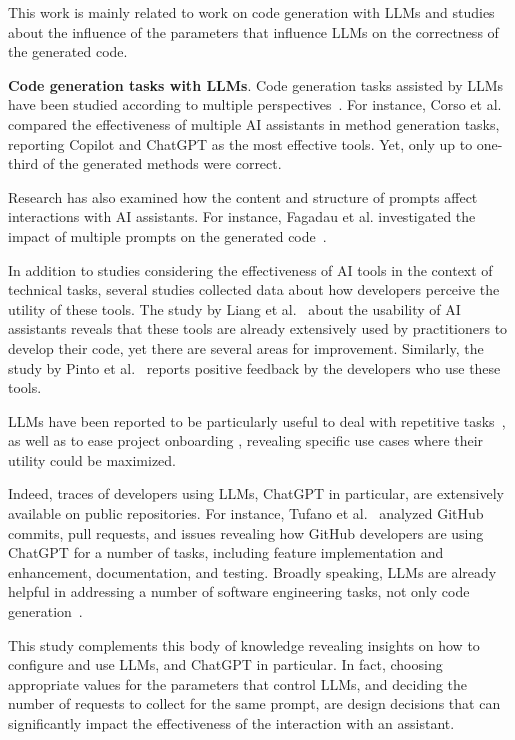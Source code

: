 
This work is mainly related to work on code generation with LLMs and studies about the influence of the parameters that influence LLMs on the correctness of the generated code.

\textbf{Code generation tasks with LLMs}. Code generation tasks assisted by LLMs have been studied according to multiple perspectives~\cite{Liguo:LLM4CG:arXiv:2024,jiang2024surveylargelanguagemodels}. For instance, Corso et al.~\cite{Corso:EmpiricalAssessment:ICPC:2024} compared the effectiveness of multiple AI assistants in method generation tasks, reporting Copilot and ChatGPT as the most effective tools. Yet, only up to one-third of the generated methods were correct.

Research has also examined how the content and structure of prompts affect interactions with AI assistants. For instance, Fagadau et al. investigated the impact of multiple prompts on the generated code~\cite{Fagadau:PromptInfluence:ICPC:2024}.

In addition to studies considering the effectiveness of AI tools in the context of technical tasks, several studies collected data about how developers perceive the utility of these tools. The study by Liang et al.~\cite{liang2024large} about the usability of AI assistants reveals that these tools are already extensively used by practitioners to develop their code, yet there are several areas for improvement.
Similarly, the study by Pinto et al.~\cite{10.1145/3644815.3644949} reports positive feedback by the developers who use these tools. 

LLMs have been reported to be particularly useful to deal with repetitive tasks~\cite{abs-2406-07765}, as well as to ease project onboarding \cite {10662989}, revealing specific use cases where their utility could be maximized. 

Indeed, traces of developers using LLMs, ChatGPT in particular, are extensively available on public repositories. For instance, Tufano et al.~\cite{10.1145/3643991.3644918} analyzed GitHub commits, pull requests, and issues revealing how GitHub developers are using ChatGPT for a number of tasks, including feature implementation and enhancement, documentation, and testing. Broadly speaking, LLMs are already helpful in addressing a number of software engineering tasks, not only code generation~\cite{FanGHLSYZ23}.

This study complements this body of knowledge revealing insights on how to configure and use LLMs, and ChatGPT in particular. In fact, choosing appropriate values for the parameters that control LLMs, and deciding the number of requests to collect for the same prompt, are design decisions that can significantly impact the effectiveness of the interaction with an assistant.

